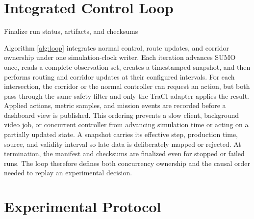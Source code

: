 \section{Integrated Control Loop}

\begin{algorithm}[H]
\caption{Single-owner simulation and decision loop}
\label{alg:loop}
Finalize run status, artifacts, and checksums\;
\end{algorithm}

Algorithm \ref{alg:loop} integrates normal control, route updates, and corridor ownership under one simulation-clock writer. Each iteration advances SUMO once, reads a complete observation set, creates a timestamped snapshot, and then performs routing and corridor updates at their configured intervals. For each intersection, the corridor or the normal controller can request an action, but both pass through the same safety filter and only the TraCI adapter applies the result. Applied actions, metric samples, and mission events are recorded before a dashboard view is published. This ordering prevents a slow client, background video job, or concurrent controller from advancing simulation time or acting on a partially updated state. A snapshot carries its effective step, production time, source, and validity interval so late data is deliberately mapped or rejected. At termination, the manifest and checksums are finalized even for stopped or failed runs. The loop therefore defines both concurrency ownership and the causal order needed to replay an experimental decision.

\section{Experimental Protocol}


